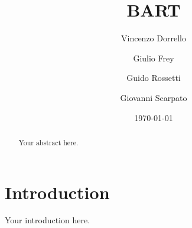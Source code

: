 \documentclass[a4paper,12pt]{article}
\title{BART}
\author{
    Vincenzo Dorrello 
    \and
    Giulio Frey 
    \and
    Guido Rossetti 
    \and
    Giovanni Scarpato 
}
\date{\today}
\begin{document}
\maketitle

\begin{abstract}
Your abstract here.
\end{abstract}


\section{Introduction}
Your introduction here.
\end{document}
